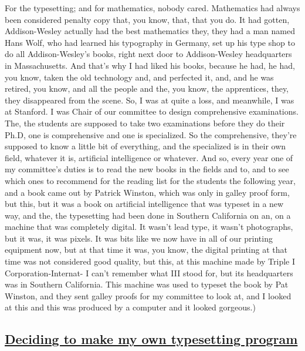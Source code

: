 \documentclass[]{article}
\begin{document}
For the typesetting; and for mathematics, nobody cared. Mathematics had
always been considered penalty copy that, you know, that, that you do.
It had gotten, Addison-Wesley actually had the best mathematics they,
they had a man named Hans Wolf, who had learned his typography in
Germany, set up his type shop to do all Addison-Wesley's books, right
next door to Addison-Wesley headquarters in Massachusetts. And that's
why I had liked his books, because he had, he had, you know, taken the
old technology and, and perfected it, and, and he was retired, you know,
and all the people and the, you know, the apprentices, they, they
disappeared from the scene. So, I was at quite a loss, and meanwhile, I
was at Stanford. I was Chair of our committee to design comprehensive
examinations. The, the students are supposed to take two examinations
before they do their Ph.D, one is comprehensive and one is specialized.
So the comprehensive, they're supposed to know a little bit of
everything, and the specialized is in their own field, whatever it is,
artificial intelligence or whatever. And so, every year one of my
committee's duties is to read the new books in the fields and to, and to
see which ones to recommend for the reading list for the students the
following year, and a book came out by Patrick Winston, which was only
in galley proof form, but this, but it was a book on artificial
intelligence that was typeset in a new way, and the, the typesetting had
been done in Southern California on an, on a machine that was completely
digital. It wasn't lead type, it wasn't photographs, but it was, it was
pixels. It was bits like we now have in all of our printing equipment
now, but at that time it was, you know, the digital printing at that
time was not considered good quality, but this, at this machine made by
Triple I Corporation-Internat- I can't remember what III stood for, but
its headquarters was in Southern California. This machine was used to
typeset the book by Pat Winston, and they sent galley proofs for my
committee to look at, and I looked at this and this was produced by a
computer and it looked gorgeous.)

\subsection{\texorpdfstring{\href{http://webofstories.com/play/17110}{Deciding
to make my own typesetting
program}}{Deciding to make my own typesetting program}}\label{deciding-to-make-my-own-typesetting-program}
\end{document}

